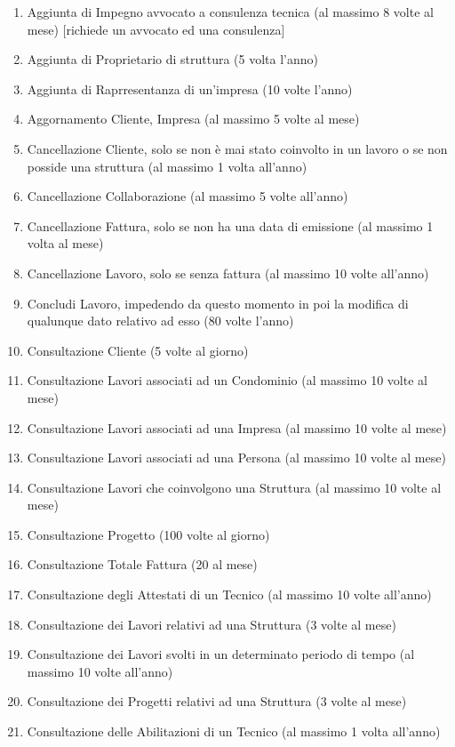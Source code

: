 \documentclass{elegantbook}
\begin{document}
\begin{enumerate}
		\item Aggiunta di Impegno avvocato a consulenza tecnica (al massimo 8 volte al mese) [richiede un avvocato ed una consulenza]
		\item Aggiunta di Proprietario di struttura (5 volta l'anno)
		\item Aggiunta di Raprresentanza di un'impresa (10 volte l'anno)
		\item Aggornamento Cliente, Impresa (al massimo 5 volte al mese)
		\item Cancellazione Cliente, solo se non è mai stato coinvolto in un lavoro o se non posside una struttura (al massimo 1 volta all'anno)
		\item Cancellazione Collaborazione (al massimo 5 volte all'anno) 
		\item Cancellazione Fattura, solo se non ha una data di emissione (al massimo 1 volta al mese)
		\item Cancellazione Lavoro, solo se senza fattura (al massimo 10 volte all'anno)
		\item Concludi Lavoro, impedendo da questo momento in poi la modifica di qualunque dato relativo ad esso (80 volte l'anno)
		\item Consultazione Cliente (5 volte al giorno)
		\item Consultazione Lavori associati ad un Condominio (al massimo 10 volte al mese)
		\item Consultazione Lavori associati ad una Impresa (al massimo 10 volte al mese)
		\item Consultazione Lavori associati ad una Persona (al massimo 10 volte al mese)
		\item Consultazione Lavori che coinvolgono una Struttura (al massimo 10 volte al mese)
		\item Consultazione Progetto (100 volte al giorno)
		\item Consultazione Totale Fattura (20 al mese)
		\item Consultazione degli Attestati di un Tecnico (al massimo 10 volte all'anno)
		\item Consultazione dei Lavori relativi ad una Struttura (3 volte al mese)
		\item Consultazione dei Lavori svolti in un determinato periodo di tempo (al massimo 10 volte all'anno)
		\item Consultazione dei Progetti relativi ad una Struttura (3 volte al mese)
		\item Consultazione delle Abilitazioni di un Tecnico (al massimo 1 volta all'anno)

\end{enumerate}
\end{document}
